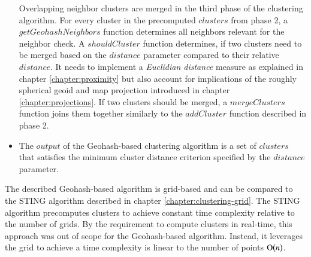 \begin{itemize}
Overlapping neighbor clusters are merged in the third phase of the clustering algorithm. For every cluster in the precomputed $clusters$ from phase 2, a $getGeohashNeighbors$ function determines all neighbors relevant for the neighbor check. A $shouldCluster$ function determines, if two clusters need to be merged based on the $distance$ parameter compared to their  relative $distance$. It needs to implement a \textit{Euclidian distance} measure as explained in chapter \ref{chapter:proximity} but also account for implications of the roughly spherical geoid and map projection introduced in chapter \ref{chapter:projections}. If two clusters should be merged, a $mergeClusters$ function joins them together similarly to the $addCluster$ function described in phase 2.

\item The $output$ of the Geohash-based clustering algorithm is a set of $clusters$ that satisfies the minimum cluster distance criterion specified by the $distance$ parameter.

\end{itemize}

The described Geohash-based algorithm is grid-based and can be compared to the STING algorithm described in chapter \ref{chapter:clustering-grid}. The STING algorithm precomputes clusters to achieve constant time complexity relative to the number of grids. By the requirement to compute clusters in real-time, this approach was out of scope for the Geohash-based algorithm. Instead, it leverages the grid to achieve a time complexity is linear to the number of points $\operatorname{O}\bigl(n\bigr)$.
